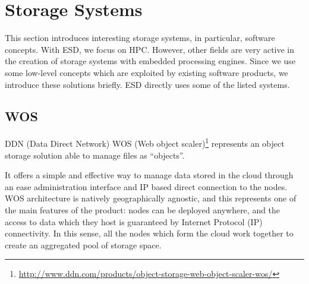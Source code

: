 \section{Storage Systems}
\label{sec: background/storage systems}

This section introduces interesting storage systems, in particular, software concepts.
With ESD, we focus on HPC. However, other fields are very active in the creation of storage systems with embedded processing engines.
Since we use some low-level concepts which are exploited by existing software products, we introduce these solutions briefly.
ESD directly uses some of the listed systems.

\subsection{WOS}
\label{WOS background}

DDN (Data Direct Network) WOS (Web object scaler)\footnote{\url{http://www.ddn.com/products/object-storage-web-object-scaler-wos/}} represents an object storage solution able to manage files as ``objects''.

It offers a simple and effective way to manage data stored in the cloud through an ease administration interface and IP based direct connection to the nodes.
WOS architecture is natively geographically agnostic, and this represents one of the main features of the product: nodes can be deployed anywhere, and the access to data which they host is guaranteed by Internet Protocol (IP) connectivity.
In this sense, all the nodes which form the cloud work together to create an aggregated pool of storage space.

